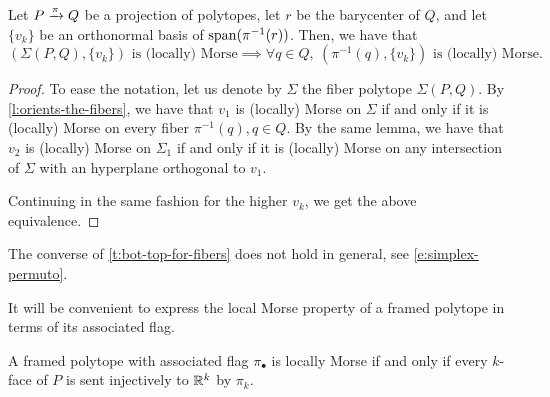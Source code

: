\begin{theorem}
\label{t:bot-top-for-fibers}
	Let $P \xrightarrow{\pi} Q$ be a projection of polytopes, let $r$ be the barycenter of $Q$, and let $\{v_k\}$ be an orthonormal basis of $\operatorname{\mathrm{span}}(\pi^{-1}(r))$.
	Then, we have that
	\[
	(\Sigma(P,Q),\{v_k\}) \text{ is (locally) Morse}
	\implies
	\forall q \in Q, \ (\pi^{-1}(q),\{v_k\}) \text{ is (locally) Morse}.
	\]
\end{theorem}

\begin{proof}
	To ease the notation, let us denote by $\Sigma$ the fiber polytope $\Sigma(P,Q)$.
	By \cref{l:orients-the-fibers}, we have that $v_1$ is (locally) Morse on $\Sigma$ if and only if it is (locally) Morse on every fiber $\pi^{-1}(q), q \in Q$.
	By the same lemma, we have that $v_2$ is (locally) Morse on $\Sigma_1$ if and only if it is (locally) Morse on any intersection of $\Sigma$ with an hyperplane orthogonal to $v_1$.

	Continuing in the same fashion for the higher $v_k$, we get the above equivalence.
\end{proof}

The converse of \cref{t:bot-top-for-fibers} does not hold in general, see \cref{e:simplex-permuto}.

It will be convenient to express the local Morse property of a framed polytope in terms of its associated flag.

\begin{theorem}
\label{t:Morse-injectivity}
	A framed polytope with associated flag $\pi_\bullet$ is locally Morse if and only if every $k$-face of $P$ is sent injectively to $\mathbb{R}^k$ by $\pi_k$.
\end{theorem}

